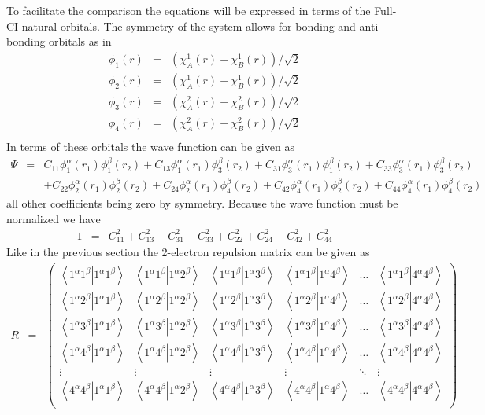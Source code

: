 \documentclass[pra,nofootinbib]{revtex4-1}
\newcommand{\eria}[4]{\left\langle #1^\alpha #2^\beta \right.\left| #3^\alpha #4^\beta \right\rangle}
\begin{document}
To facilitate the comparison the equations will be expressed in terms of the Full-CI natural
orbitals. The symmetry of the system allows for bonding and anti-bonding orbitals as in
\begin{eqnarray}
   \phi_1(r) &=& (\chi_A^1(r)+\chi_B^1(r))/\sqrt{2} \\
   \phi_2(r) &=& (\chi_A^1(r)-\chi_B^1(r))/\sqrt{2} \\
   \phi_3(r) &=& (\chi_A^2(r)+\chi_B^2(r))/\sqrt{2} \\
   \phi_4(r) &=& (\chi_A^2(r)-\chi_B^2(r))/\sqrt{2} \\
\end{eqnarray}
In terms of these orbitals the wave function can be given as
\begin{eqnarray}
  \Psi &=& C_{11}\phi^\alpha_1(r_1)\phi^\beta_1(r_2)
        +  C_{13}\phi^\alpha_1(r_1)\phi^\beta_3(r_2)
        +  C_{31}\phi^\alpha_3(r_1)\phi^\beta_1(r_2)
        +  C_{33}\phi^\alpha_3(r_1)\phi^\beta_3(r_2) \nonumber \\
       &&+ C_{22}\phi^\alpha_2(r_1)\phi^\beta_2(r_2)
        +  C_{24}\phi^\alpha_2(r_1)\phi^\beta_4(r_2)
        +  C_{42}\phi^\alpha_4(r_1)\phi^\beta_2(r_2)
        +  C_{44}\phi^\alpha_4(r_1)\phi^\beta_4(r_2)
\end{eqnarray}
all other coefficients being zero by symmetry.
Because the wave function must be normalized we have
\begin{eqnarray}
  1 &=& C_{11}^2 + C_{13}^2 + C_{31}^2 + C_{33}^2 
     +  C_{22}^2 + C_{24}^2 + C_{42}^2 + C_{44}^2
\end{eqnarray}
Like in the previous section the 2-electron repulsion matrix can be given as
\begin{eqnarray}
  R &=& 
  \begin{pmatrix}
  \eria{1}{1}{1}{1} & \eria{1}{1}{1}{2} & \eria{1}{1}{1}{3} & \eria{1}{1}{1}{4} & \ldots & \eria{1}{1}{4}{4} \\
  \eria{1}{2}{1}{1} & \eria{1}{2}{1}{2} & \eria{1}{2}{1}{3} & \eria{1}{2}{1}{4} & \ldots & \eria{1}{2}{4}{4} \\
  \eria{1}{3}{1}{1} & \eria{1}{3}{1}{2} & \eria{1}{3}{1}{3} & \eria{1}{3}{1}{4} & \ldots & \eria{1}{3}{4}{4} \\
  \eria{1}{4}{1}{1} & \eria{1}{4}{1}{2} & \eria{1}{4}{1}{3} & \eria{1}{4}{1}{4} & \ldots & \eria{1}{4}{4}{4} \\
  \vdots            & \vdots            & \vdots            & \vdots            & \ddots & \vdots            \\
  \eria{4}{4}{1}{1} & \eria{4}{4}{1}{2} & \eria{4}{4}{1}{3} & \eria{4}{4}{1}{4} & \ldots & \eria{4}{4}{4}{4} \\
  \end{pmatrix}
\end{eqnarray}
\end{document}
